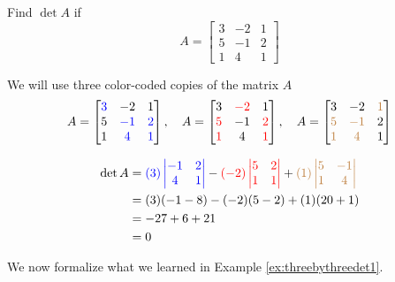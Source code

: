 \documentclass{ximera}
\begin{document}
\begin{example}\label{ex:threebythreedet1}
Find $\det{A}$ if 
$$A=\begin{bmatrix}3&-2&1\\5&-1&2\\1&4&1\end{bmatrix}$$

\begin{explanation}
We will use three color-coded copies of the matrix $A$
$$A=\begin{bmatrix}{\color{blue}3}&-2&1\\5&{\color{blue}-1}&{\color{blue}2}\\1&{\color{blue}4}&{\color{blue}1}\end{bmatrix},\quad A=\begin{bmatrix}3&{\color{red}-2}&1\\{\color{red}5}&-1&{\color{red}2}\\{\color{red}1}&4&{\color{red}1}\end{bmatrix},\quad A=\begin{bmatrix}3&-2&{\color{brown}1}\\{\color{brown}5}&{\color{brown}-1}&2\\{\color{brown}1}&{\color{brown}4}&1\end{bmatrix}$$

\begin{align*}
\det{A}&={\color{blue}(3)\begin{vmatrix}-1&2\\4&1\end{vmatrix}}-{\color{red}(-2)\begin{vmatrix}5&2\\1&1\end{vmatrix}}+{\color{brown}(1)\begin{vmatrix}5&-1\\1&4\end{vmatrix}}\\
&=(3)(-1-8)-(-2)(5-2)+(1)(20+1)\\
&=-27+6+21\\
&=0
\end{align*}

\end{explanation}
\end{example}

We now formalize what we learned in Example \ref{ex:threebythreedet1}.
\end{document}

